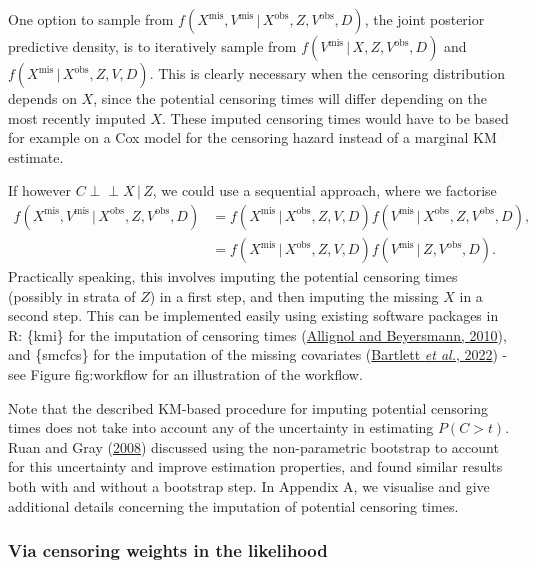 \documentclass[
  letterpaper,
  DIV=11,
  numbers=noendperiod]{scrreprt}
\newcommand{\given}{\,|\,}
\newcommand{\indep}{\perp\!\!\!\!\perp}
\begin{document}
One option to sample from
\(f(X^{\text{mis}}, V^{\text{mis}} \given X^{\text{obs}},Z,V^{\text{obs}},D)\),
the joint posterior predictive density, is to iteratively sample from
\(f(V^{\text{mis}} \given X,Z,V^{\text{obs}},D)\) and
\(f(X^{\text{mis}} \given X^{\text{obs}},Z,V,D)\). This is clearly
necessary when the censoring distribution depends on \(X\), since the
potential censoring times will differ depending on the most recently
imputed \(X\). These imputed censoring times would have to be based for
example on a Cox model for the censoring hazard instead of a marginal KM
estimate.

If however \(C \indep X \given Z\), we could use a sequential approach,
where we factorise \begin{align*}
    f(X^{\text{mis}}, V^{\text{mis}} \given X^{\text{obs}},Z,V^{\text{obs}},D) &= f(X^{\text{mis}} \given X^{\text{obs}},Z,V,D)f(V^{\text{mis}} \given X^{\text{obs}},Z,V^{\text{obs}},D), \\
    &= f(X^{\text{mis}} \given X^{\text{obs}},Z,V,D)f(V^{\text{mis}} \given Z,V^{\text{obs}},D).
\end{align*} Practically speaking, this involves imputing the potential
censoring times (possibly in strata of \(Z\)) in a first step, and then
imputing the missing \(X\) in a second step. This can be implemented
easily using existing software packages in R: \{kmi\} for the imputation
of censoring times
(\protect\hyperlink{ref-allignolSoftwareFittingNonstandard2010}{Allignol
and Beyersmann, 2010}), and \{smcfcs\} for the imputation of the missing
covariates
(\protect\hyperlink{ref-bartlettSmcfcsMultipleImputation2022}{Bartlett
\emph{et al.}, 2022}) - see Figure fig:workflow for an illustration of
the workflow.

Note that the described KM-based procedure for imputing potential
censoring times does not take into account any of the uncertainty in
estimating \(P(C > t)\). Ruan and Gray
(\protect\hyperlink{ref-ruanAnalysesCumulativeIncidence2008}{2008})
discussed using the non-parametric bootstrap to account for this
uncertainty and improve estimation properties, and found similar results
both with and without a bootstrap step. In Appendix A, we visualise and
give additional details concerning the imputation of potential censoring
times.

\hypertarget{via-censoring-weights-in-the-likelihood}{%
\subsubsection{Via censoring weights in the
likelihood}\label{via-censoring-weights-in-the-likelihood}}
\end{document}

